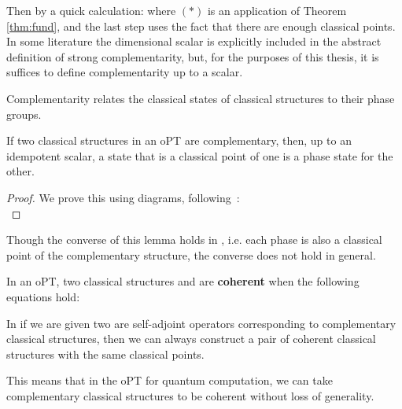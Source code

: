 Then by a quick calculation:
where $(*)$ is an application of Theorem \ref{thm:fund}, and the last step uses the fact that there are enough classical points.  In some literature the dimensional scalar is explicitly included in the abstract definition of strong complementarity, but, for the purposes of this thesis, it is suffices to define complementarity up to a scalar. 

Complementarity relates the classical states of classical structures to their phase groups.
\begin{lemma}
\label{lem:phaseunbiased}
If two classical structures in an oPT are complementary, then, up to an idempotent scalar, a state that is a classical point of one is a phase state for the other.
\end{lemma}
\begin{proof}
We prove this using diagrams, following~\cite{qcs-notes}:
\begin{equation}

\end{equation}
\end{proof}
Though the converse of this lemma holds in , i.e. each phase is also a classical point of the complementary structure, the converse does not hold in general.

%

\begin{defn}\label{def:coherence}
In an oPT, two classical structures  and  are \textbf{coherent} when the following equations hold:
\begin{equation}
\label{eq:coherence}
 
\end{equation}
\end{defn}

\begin{proposition}
\label{prop:cohere}
In  if we are given two are self-adjoint operators corresponding to complementary classical structures, then we can always construct a pair of coherent classical structures with the same classical points.
\end{proposition}
\noindent This means that in the oPT for quantum computation, we can take complementary classical structures to be coherent without loss of generality.

